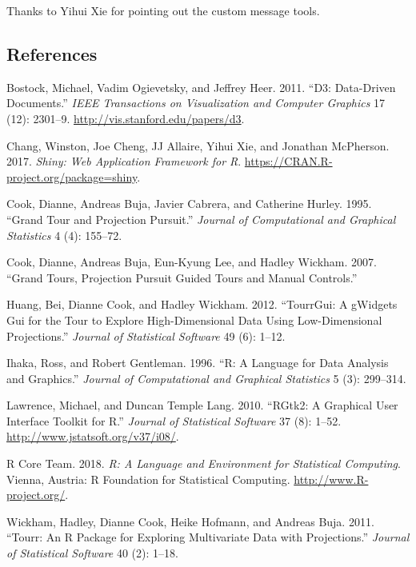 Thanks to Yihui Xie for pointing out the custom message tools.

\hypertarget{references}{%
\subsection{References}\label{references}}

\hypertarget{refs}{}
\leavevmode\hypertarget{ref-D3}{}%
Bostock, Michael, Vadim Ogievetsky, and Jeffrey Heer. 2011. ``D3:
Data-Driven Documents.'' \emph{IEEE Transactions on Visualization and
Computer Graphics} 17 (12): 2301--9.
\url{http://vis.stanford.edu/papers/d3}.

\leavevmode\hypertarget{ref-shiny}{}%
Chang, Winston, Joe Cheng, JJ Allaire, Yihui Xie, and Jonathan
McPherson. 2017. \emph{Shiny: Web Application Framework for R}.
\url{https://CRAN.R-project.org/package=shiny}.

\leavevmode\hypertarget{ref-gt_pp}{}%
Cook, Dianne, Andreas Buja, Javier Cabrera, and Catherine Hurley. 1995.
``Grand Tour and Projection Pursuit.'' \emph{Journal of Computational
and Graphical Statistics} 4 (4): 155--72.

\leavevmode\hypertarget{ref-gt_pp_mc}{}%
Cook, Dianne, Andreas Buja, Eun-Kyung Lee, and Hadley Wickham. 2007.
``Grand Tours, Projection Pursuit Guided Tours and Manual Controls.''

\leavevmode\hypertarget{ref-tourrGui}{}%
Huang, Bei, Dianne Cook, and Hadley Wickham. 2012. ``TourrGui: A
gWidgets Gui for the Tour to Explore High-Dimensional Data Using
Low-Dimensional Projections.'' \emph{Journal of Statistical Software} 49
(6): 1--12.

\leavevmode\hypertarget{ref-ihaka:1996}{}%
Ihaka, Ross, and Robert Gentleman. 1996. ``R: A Language for Data
Analysis and Graphics.'' \emph{Journal of Computational and Graphical
Statistics} 5 (3): 299--314.

\leavevmode\hypertarget{ref-RGtk2}{}%
Lawrence, Michael, and Duncan Temple Lang. 2010. ``RGtk2: A Graphical
User Interface Toolkit for R.'' \emph{Journal of Statistical Software}
37 (8): 1--52. \url{http://www.jstatsoft.org/v37/i08/}.

\leavevmode\hypertarget{ref-R}{}%
R Core Team. 2018. \emph{R: A Language and Environment for Statistical
Computing}. Vienna, Austria: R Foundation for Statistical Computing.
\url{http://www.R-project.org/}.

\leavevmode\hypertarget{ref-tourr}{}%
Wickham, Hadley, Dianne Cook, Heike Hofmann, and Andreas Buja. 2011.
``Tourr: An R Package for Exploring Multivariate Data with
Projections.'' \emph{Journal of Statistical Software} 40 (2): 1--18.

